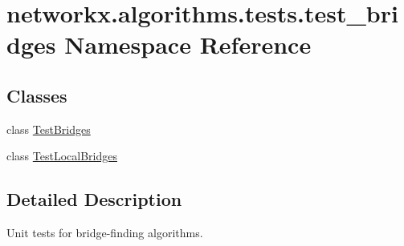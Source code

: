 \hypertarget{namespacenetworkx_1_1algorithms_1_1tests_1_1test__bridges}{}\section{networkx.\+algorithms.\+tests.\+test\+\_\+bridges Namespace Reference}
\label{namespacenetworkx_1_1algorithms_1_1tests_1_1test__bridges}
\subsection*{Classes}
\begin{DoxyCompactItemize}
\item 
class \hyperlink{classnetworkx_1_1algorithms_1_1tests_1_1test__bridges_1_1TestBridges}{Test\+Bridges}
\item 
class \hyperlink{classnetworkx_1_1algorithms_1_1tests_1_1test__bridges_1_1TestLocalBridges}{Test\+Local\+Bridges}
\end{DoxyCompactItemize}


\subsection{Detailed Description}
\begin{DoxyVerb}Unit tests for bridge-finding algorithms.\end{DoxyVerb}
 